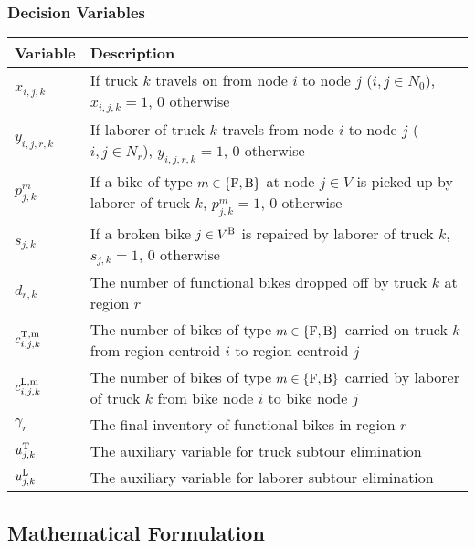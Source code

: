 \subsubsection{Decision Variables}

\renewcommand{\arraystretch}{1.25}
\begin{longtable}{p{2cm}p{10cm}}
    \toprule
    Variable            & Description                                                                                                              \\
    \midrule
    \endhead
    $x_{i,j,k}$         & If truck $k$ travels on from node $i$ to node $j$ ($i,j \in N_0$), $x_{i,j,k} = 1$, 0 otherwise                          \\
    $y_{i,j,r,k}$       & If laborer of truck $k$ travels from node $i$ to node $j$ ($i,j \in N_r$), $y_{i,j,r,k} = 1$, 0 otherwise                \\
    $p^m_{j,k}$         & If a bike of type $m \in \{\text{F},\text{B}\}$ at node $j \in V$ is picked up by laborer of truck $k$, $p^m_{j,k} = 1$, 0 otherwise \\
    $s_{j,k}$           & If a broken bike $j \in V^{\text{B}}$ is repaired by laborer of truck $k$, $s_{j,k} = 1$, 0 otherwise                          \\
    $d_{r,k}$           & The number of functional bikes dropped off by truck $k$ at region $r$                                                    \\
    $c_{i,j,k}^{\text{T,m}}$ & The number of bikes of type $m \in \{\text{F},\text{B}\}$ carried on truck $k$ from region centroid $i$ to region centroid $j$       \\
    $c_{i,j,k}^{\text{L,m}}$ & The number of bikes of type $m \in \{\text{F},\text{B}\}$ carried by laborer of truck $k$ from bike node $i$ to bike node $j$        \\
    $\gamma_r$          & The final inventory of functional bikes in region $r$                                                                    \\
    $u_{j,k}^{\text{T}}$      & The auxiliary variable for truck subtour elimination                                                                     \\
    $u_{j,k}^{\text{L}}$      & The auxiliary variable for laborer subtour elimination                                                                   \\
    \bottomrule
\end{longtable}

\subsection{Mathematical Formulation}

